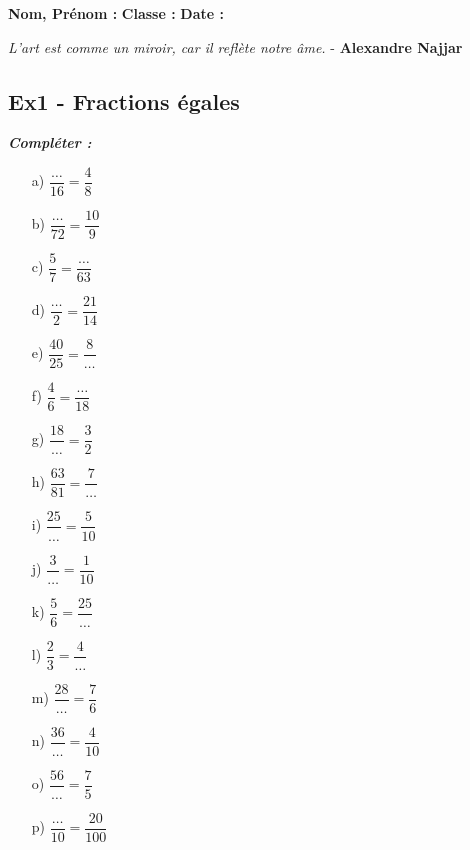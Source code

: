 \documentclass[11pt]{article}
\begin{document}
\setlength{\columnseprule}{1pt}

\textbf{Nom, Prénom :} \hspace{8cm} \textbf{Classe :} \hspace{3cm} \textbf{Date :}\\

\begin{center}
  \textit{L'art est comme un miroir, car il reflète notre âme.}  - \textbf{Alexandre Najjar}
\end{center}

\subsection*{Ex1 - Fractions égales}

\textit{\textbf{Compléter :}}

\begin{multicols}{4}

  \begin{enumerate}
  \item[a)] $\dfrac{\ldots}{16}=\dfrac{4}{8}$
  \item[b)] $\dfrac{\ldots}{72}=\dfrac{10}{9}$
  \item[c)] $\dfrac{5}{7}=\dfrac{\ldots}{63}$
  \item[d)] $\dfrac{\ldots}{2}=\dfrac{21}{14}$
  \item[e)] $\dfrac{40}{25}=\dfrac{8}{\ldots}$
  \item[f)] $\dfrac{4}{6}=\dfrac{\ldots}{18}$
  \item[g)] $\dfrac{18}{\ldots}=\dfrac{3}{2}$
  \item[h)] $\dfrac{63}{81}=\dfrac{7}{\ldots}$
  \item[i)] $\dfrac{25}{\ldots}=\dfrac{5}{10}$
  \item[j)] $\dfrac{3}{\ldots}=\dfrac{1}{10}$
  \item[k)] $\dfrac{5}{6}=\dfrac{25}{\ldots}$
  \item[l)] $\dfrac{2}{3}=\dfrac{4}{\ldots}$
  \item[m)] $\dfrac{28}{\ldots}=\dfrac{7}{6}$
  \item[n)] $\dfrac{36}{\ldots}=\dfrac{4}{10}$
  \item[o)] $\dfrac{56}{\ldots}=\dfrac{7}{5}$
  \item[p)] $\dfrac{\ldots}{10}=\dfrac{20}{100}$
  \end{enumerate}

\end{multicols}
\end{document}
